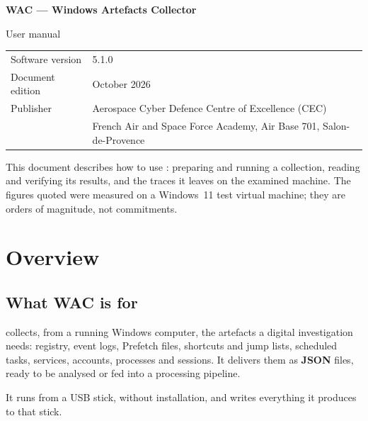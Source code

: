 \documentclass[11pt,a4paper,oneside]{report}
\begin{document}

\thispagestyle{empty}
\vspace*{\fill}
{\color{marine}\Large\bfseries WAC — Windows Artefacts Collector}\par
{\color{bleu}User manual}\par
\medskip
\begin{tabular}{@{}ll@{}}
Software version & 5.1.0 \\
Document edition & October 2026 \\
Publisher & Aerospace Cyber Defence Centre of Excellence (CEC) \\
          & French Air and Space Force Academy, Air Base 701, Salon-de-Provence \\
\end{tabular}

\bigskip
{\small\color{gris}This document describes how to use \wac{}: preparing and
running a collection, reading and verifying its results, and the traces it
leaves on the examined machine. The figures quoted were measured on a
Windows~11 test virtual machine; they are orders of magnitude, not
commitments.}
\vspace*{2cm}
\clearpage

\tableofcontents

\chapter{Overview}

\section{What WAC is for}

\wac{} collects, from a running Windows computer, the artefacts a digital
investigation needs: registry, event logs, Prefetch files, shortcuts and jump
lists, scheduled tasks, services, accounts, processes and sessions. It delivers
them as \textbf{JSON} files, ready to be analysed or fed into a processing
pipeline.

It runs from a USB stick, without installation, and writes everything it
produces to that stick.
\end{document}
